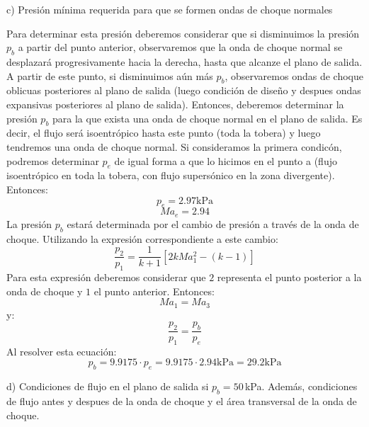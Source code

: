 \documentclass[11pt]{report}
\begin{document}
\vspace{0.2cm}
c) Presi\'on m\'inima requerida para que se formen ondas de choque normales

Para determinar esta presi\'on deberemos considerar que si disminuimos la presi\'on $p_b$ a partir del punto anterior, observaremos que la onda de choque normal se desplazar\'a progresivamente hacia la derecha, hasta que alcanze el plano de salida. A partir de este punto, si disminuimos a\'un m\'as $p_b$, observaremos ondas de choque oblicuas posteriores al plano de salida (luego condici\'on de diseño y despues ondas expansivas posteriores al plano de salida). Entonces, deberemos determinar la presi\'on $p_b$ para la que exista una onda de choque normal en el plano de salida. Es decir, el flujo ser\'a isoentr\'opico hasta este punto (toda la tobera) y luego tendremos una onda de choque normal. Si consideramos la primera condic\'on, podremos determinar $p_e$ de igual forma a que lo hicimos en el punto a (flujo isoentr\'opico en toda la tobera, con flujo supers\'onico en la zona divergente). Entonces:
$$p_e=2.97 \mathrm{kPa}$$
$$Ma_e=2.94$$
La presi\'on $p_b$ estar\'a determinada por el cambio de presi\'on a trav\'es de la onda de choque. Utilizando la expresi\'on correspondiente a este cambio:
$$
\frac{p_{2}}{p_{1}}=\frac{1}{k+1}\left[2 k M a_{1}^{2}-(k-1)\right]
$$
Para esta expresi\'on deberemos considerar que $2$ representa el punto posterior a la onda de choque y $1$ el punto anterior. Entonces:
$$Ma_1=Ma_3$$
y:
$$
\frac{p_{2}}{p_{1}}=\frac{p_{b}}{p_{e}}
$$
Al resolver esta ecuaci\'on:
$$
p_{b}=9.9175 \cdot p_{e}=9.9175 \cdot2.94 \mathrm{kPa} = 29.2 \mathrm{kPa}
$$

\vspace{0.2cm}
d) Condiciones de flujo en el plano de salida si $p_b=50$\,kPa. Adem\'as, condiciones de flujo antes y despues de la onda de choque y el \'area transversal de la onda de choque.
\end{document}
